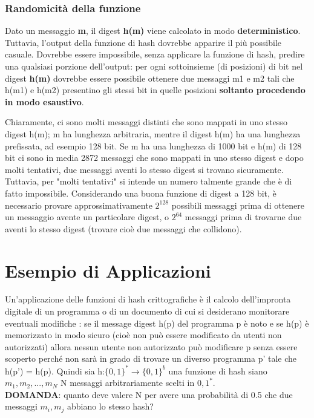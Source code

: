 \subsubsection{Randomicità della funzione}
Dato un messaggio \textbf{m}, il digest \textbf{h(m)} viene calcolato in modo \textbf{deterministico}. Tuttavia, l'output della funzione di hash dovrebbe apparire il più possibile casuale. Dovrebbe essere impossibile, senza applicare la funzione di hash, predire una qualsiasi porzione dell'output: per ogni sottoinsieme (di posizioni) di bit nel digest \textbf{h(m)} dovrebbe essere possibile ottenere due messaggi m1 e m2 tali che h(m1) e h(m2) presentino gli stessi bit in quelle posizioni \textbf{soltanto procedendo in modo esaustivo}. \newline \newline

Chiaramente, ci sono molti messaggi distinti che sono mappati in uno stesso digest h(m); m ha lunghezza arbitraria, mentre il digest h(m) ha una lunghezza prefissata, ad esempio 128 bit. Se m ha una lunghezza di 1000 bit e h(m) di 128 bit ci sono in media 2872 messaggi che sono mappati in uno stesso digest e dopo molti tentativi, due messaggi aventi lo stesso digest si trovano sicuramente. Tuttavia, per "molti tentativi" si intende un numero talmente grande che è di fatto impossibile. Considerando una buona funzione di digest a 128 bit, è necessario provare approssimativamente $2^{128}$ possibili messaggi prima di ottenere un messaggio avente un particolare digest, o $2^{64}$ messaggi prima di trovarne due aventi lo stesso digest (trovare cioè due messaggi che collidono).

\section{Esempio di Applicazioni}
Un’applicazione delle funzioni di hash crittografiche è il calcolo dell’impronta digitale di un programma o di un documento di cui si desiderano monitorare eventuali modifiche : se il message digest h(p) del programma p è noto e se h(p) è memorizzato in modo sicuro (cioè non può essere modificato da utenti non autorizzati) allora nessun utente non autorizzato può modificare p senza essere scoperto perché non sarà in grado di trovare un diverso programma p’ tale che h(p’) = h(p).
Quindi sia h:$\{0, 1\}^{*} \rightarrow \{0, 1\}^{b}$ una funzione di hash siano $m_{1}, m_{2}, ..., m_{N}$ N messaggi arbitrariamente
scelti in ${0, 1}^{*}$. \\
\textbf{DOMANDA}: quanto deve valere N per avere una probabilità di 0.5 che due messaggi $m_{i}, m_{j}$ abbiano lo stesso hash?

